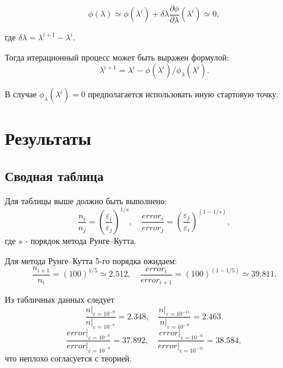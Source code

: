 \documentclass[a4paper,12pt]{article}
\begin{document}
\begin{equation*}
  \phi(\lambda)\simeq\phi(\lambda^{i})+\delta \lambda\frac{\partial \phi}{\partial \lambda}(\lambda^{i})\simeq0,
\end{equation*}

где \(\delta \lambda=\lambda^{i+1}-\lambda^{i}\). 

Тогда итерационный процесс может быть выражен формулой:
\begin{equation*}
  \lambda^{i+1}=\lambda^{i}-\phi(\lambda^{i}) / \phi_\lambda(\lambda^{i}).
\end{equation*}

В случае \(\phi_\lambda(\lambda^{i})=0\) предполагается использовать иную стартовую точку.

\section*{Результаты}

\subsection*{Сводная таблица}

Для таблицы выше должно быть выполнено:
\begin{equation*}
  \frac{n_{i}}{n_{j}}=\left(\frac{\varepsilon_{i}}{\varepsilon_{j}}\right)^{1/s}, \quad \frac{error_{i}}{error_{j}}=\left(\frac{\varepsilon_{j}}{\varepsilon_{i}}\right)^{(1-1/s)},
\end{equation*}
где \(s\) - порядок метода Рунге--Кутта.

Для метода Рунге--Кутта 5-го порядка ожидаем:
\begin{equation*}
  \frac{n_{i+1}}{n_{i}}=\left(100\right)^{1/5}\simeq2.512, \quad \frac{error_{i}}{error_{i+1}}=\left(100\right)^{(1-1/5)}\simeq39.811.
\end{equation*}

Из табличных данных следует
\begin{equation*}
  \frac{\left.n\right\vert_{\varepsilon=10^{-9}}}{\left.n\right\vert_{\varepsilon=10^{-7}}}=2.348, \quad
  \frac{\left.n\right\vert_{\varepsilon=10^{-11}}}{\left.n\right\vert_{\varepsilon=10^{-9}}}=2.463.
\end{equation*}
\begin{equation*}
  \frac{\left.error\right\vert_{\varepsilon=10^{-7}}}{\left.error\right\vert_{\varepsilon=10^{-9}}}=37.892, \quad
  \frac{\left.error\right\vert_{\varepsilon=10^{-9}}}{\left.error\right\vert_{\varepsilon=10^{-11}}}=38.584,
\end{equation*}
что неплохо согласуется с теорией.
\end{document}
